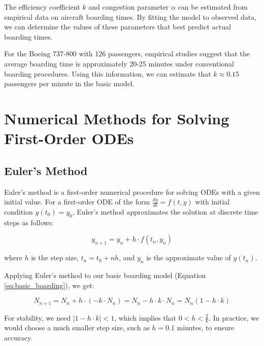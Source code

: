 \documentclass[12pt,a4paper]{article}
\begin{document}
The efficiency coefficient $k$ and congestion parameter $\alpha$ can be estimated from empirical data on aircraft boarding times. By fitting the model to observed data, we can determine the values of these parameters that best predict actual boarding times.

For the Boeing 737-800 with 126 passengers, empirical studies suggest that the average boarding time is approximately 20-25 minutes under conventional boarding procedures. Using this information, we can estimate that $k \approx 0.15$ passengers per minute in the basic model.

\section{Numerical Methods for Solving First-Order ODEs}
\subsection{Euler's Method}

Euler's method is a first-order numerical procedure for solving ODEs with a given initial value. For a first-order ODE of the form $\frac{dy}{dt} = f(t, y)$ with initial condition $y(t_0) = y_0$, Euler's method approximates the solution at discrete time steps as follows:

\begin{equation}
y_{n+1} = y_n + h \cdot f(t_n, y_n)
\label{eq:euler}
\end{equation}

where $h$ is the step size, $t_n = t_0 + nh$, and $y_n$ is the approximate value of $y(t_n)$.

Applying Euler's method to our basic boarding model (Equation \ref{eq:basic_boarding}), we get:

\begin{equation}
N_{n+1} = N_n + h \cdot (-k \cdot N_n) = N_n - h \cdot k \cdot N_n = N_n (1 - h \cdot k)
\label{eq:euler_boarding}
\end{equation}

For stability, we need $|1 - h \cdot k| < 1$, which implies that $0 < h < \frac{2}{k}$. In practice, we would choose a much smaller step size, such as $h = 0.1$ minutes, to ensure accuracy.
\end{document}
